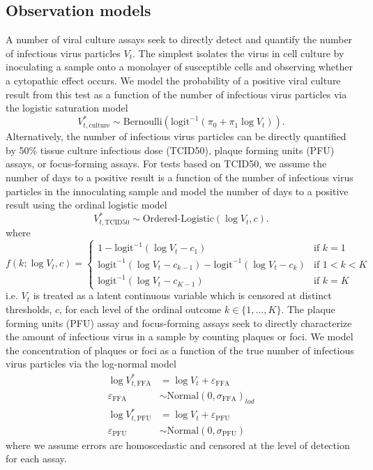 \documentclass[11pt]{article}
\begin{document}
\subsection{Observation models}
A number of viral culture assays seek to directly detect and quantify the number of infectious virus particles $V_t$. The simplest isolates the virus in cell culture by inoculating a sample onto a monolayer of susceptible cells and observing whether a cytopathic effect occurs. We model the probability of a positive viral culture result from this test as a function of the number of infectious virus particles via the logistic saturation model
\begin{equation*}
    V^{*}_{t,\text{culture}} \sim \text{Bernoulli}(\text{logit}^{-1}(\pi_0 + \pi_1 \log V_t)).
\end{equation*}
Alternatively, the number of infectious virus particles can be directly quantified by 50\% tissue culture infectious dose (TCID50), plaque forming units (PFU) assays, or focus-forming assays. For tests based on TCID50, we assume the number of days to a positive result is a function of the number of infectious virus particles in the innoculating sample and model the number of days to a positive result using the ordinal logistic model
\begin{equation*}
    V^{*}_{t,\text{TCID50}} \sim \text{Ordered-Logistic}(\log V_t, c).
\end{equation*}
where 
\begin{equation*}
    f(k; \log V_t, c) = 
    \begin{cases}
        1 - \text{logit}^{-1}(\log V_t - c_1) & \text{if } k = 1 \\
        \text{logit}^{-1}(\log V_t - c_{k-1}) - \text{logit}^{-1}(\log V_t - c_k) & \text{if } 1 < k < K \\
        \text{logit}^{-1}(\log V_t - c_{K-1}) & \text{if } k = K
    \end{cases}
\end{equation*}
i.e. $V_t$ is treated as a latent continuous variable which is censored at distinct thresholds, $c$, for each level of the ordinal outcome $k \in \{1, \ldots, K\}$. The plaque forming units (PFU) assay and focus-forming assays seek to directly characterize the amount of infectious virus in a sample by counting plaques or foci. We model the concentration of plaques or foci as a function of the true number of infectious virus particles via the log-normal model
\begin{align*}
    \log V^{*}_{t,\text{FFA}} &= \log V_t + \varepsilon_{\text{FFA}} \\
    \varepsilon_{\text{FFA}} &\sim \text{Normal}(0, \sigma_{\text{FFA}})_{lod} \\
    \log V^{*}_{t,\text{PFU}} &= \log V_t + \varepsilon_{\text{PFU}} \\
    \varepsilon_{\text{PFU}} &\sim \text{Normal}(0, \sigma_{\text{PFU}})
\end{align*}
where we assume errors are homoscedastic and censored at the level of detection for each assay. 
\end{document}

